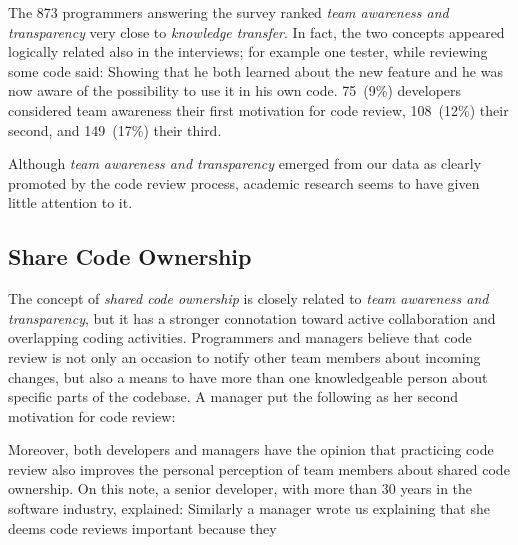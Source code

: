 The 873 programmers answering the survey ranked \emph{team awareness and
transparency} very close to \emph{knowledge transfer}. In fact, the two concepts
appeared logically related also in the interviews; for example one tester,
while reviewing some code said:  Showing that he both
learned about the new feature and he was now aware of the possibility to use it
in his own code. 75~(9\%) developers considered team awareness their first
motivation for code review, 108~(12\%) their second, and 149~(17\%) their
third. 

Although \emph{team awareness and transparency} emerged from our data as clearly
promoted by the code review process, academic research seems to have given
little attention to it. 

\subsection{Share Code Ownership}

The concept of \emph{shared code ownership} is closely related to \emph{team awareness
and transparency}, but it has a stronger connotation toward active
collaboration and overlapping coding activities. Programmers and managers
believe that code review is not only an occasion to notify other team members
about incoming changes, but also a means to have more than one knowledgeable
person about specific parts of the codebase. A manager put the following as her
second motivation for code review: 

Moreover, both developers and managers have the opinion that practicing code
review also improves the personal perception of team members about shared code
ownership. On this note, a senior developer, with more than 30 years in the
software industry, explained:  Similarly a manager wrote us explaining that she deems code
reviews important because they 

